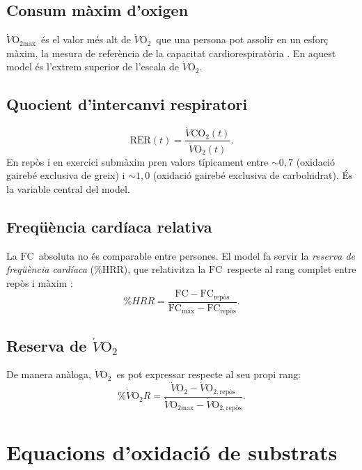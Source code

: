 \documentclass[10pt,a4paper]{article}
\newcommand{\VO}{\ensuremath{\dot V\mathrm{O_2}}}
\newcommand{\VCO}{\ensuremath{\dot V\mathrm{CO_2}}}
\newcommand{\VOmax}{\ensuremath{\dot V\mathrm{O_{2max}}}}
\newcommand{\RER}{\ensuremath{\mathrm{RER}}}
\newcommand{\FC}{\ensuremath{\mathrm{FC}}}
\begin{document}
\subsection{Consum màxim d'oxigen}
\VOmax\ és el valor més alt de \VO\ que una persona pot assolir en un esforç
màxim, la mesura de referència de la capacitat cardiorespiratòria
\citep{bassett2000}. En aquest model és l'extrem superior de l'escala de \VO.

\subsection{Quocient d'intercanvi respiratori}
\begin{equation}
  \RER(t)=\frac{\VCO(t)}{\VO(t)} .
\end{equation}
En repòs i en exercici submàxim pren valors típicament entre $\sim0{,}7$ (oxidació
gairebé exclusiva de greix) i $\sim1{,}0$ (oxidació gairebé exclusiva de
carbohidrat). És la variable central del model.

\subsection{Freqüència cardíaca relativa}
La \FC\ absoluta no és comparable entre persones. El model fa servir la
\emph{reserva de freqüència cardíaca} (\%HRR), que relativitza la \FC\ respecte al
rang complet entre repòs i màxim \citep{karvonen1957}:
\begin{equation}
  \%HRR=\frac{\FC-\FC_{\mathrm{repòs}}}{\FC_{\mathrm{màx}}-\FC_{\mathrm{repòs}}} .
\end{equation}

\subsection{Reserva de \VO}
De manera anàloga, \VO\ es pot expressar respecte al seu propi rang:
\begin{equation}
  \%\dot V\mathrm{O_2}R=\frac{\VO-\dot V\mathrm{O_{2,repòs}}}{\VOmax-\dot V\mathrm{O_{2,repòs}}} .
\end{equation}

\section{Equacions d'oxidació de substrats}\label{sec:jw}
\end{document}
